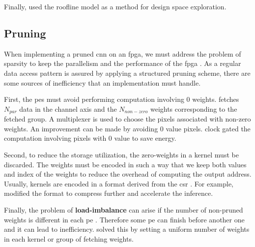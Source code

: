 Finally, \textcite{liu_fpga-based_2019} used the roofline model as a method for design space exploration.
%
%
\subsection{Pruning} \label{subsec:impl_prun}
%
%
When implementing a pruned \acrshort{cnn} on an \acrshort{fpga}, we must address the problem of sparsity to keep the parallelism and the performance of the \acrshort{fpga} \cite{zhu_efficient_2020}. As a regular data access pattern is assured by applying a structured pruning scheme, there are some sources of inefficiency that an implementation must handle.

First, the \acrshort{pe}s must avoid performing computation involving 0 weights. \textcite{kang_accelerator-aware_2020} fetches $N_{par}$ data in the channel axis and the $N_{non-zero}$ weights corresponding to the fetched group. A multiplexer is used to choose the pixels associated with non-zero weights. An improvement can be made by avoiding 0 value pixels. \textcite{zhu_efficient_2020} clock gated the computation involving pixels with 0 value to save energy.

Second, to reduce the storage utilization, the zero-weights in a kernel must be discarded. The weights must be encoded in such a way that we keep both values and index of the weights to reduce the overhead of computing the output address. Usually, kernels are encoded in a format derived from the \acrfull{csr} \cite{mao_exploring_2017}. For example, \cite{zhu_efficient_2020} modified the format to compress further and accelerate the inference.

Finally, the problem of \textbf{load-imbalance} can arise if the number of non-pruned weights is different in each \acrshort{pe} \cite{kim_zena_2018}. Therefore some \acrshort{pe} can finish before another one and it can lead to inefficiency. \textcite{zhu_efficient_2020, kang_accelerator-aware_2020} solved this by setting a uniform number of weights in each kernel or group of fetching weights.
